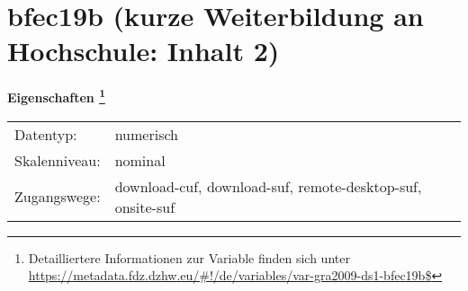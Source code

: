 
    \setcounter{footnote}{0}

    \vspace*{-1.8cm}
	\section{bfec19b (kurze Weiterbildung an Hochschule: Inhalt 2)}
	\label{section:bfec19b}



    \vspace*{0.5cm}
    \noindent\textbf{Eigenschaften
	\footnote{Detailliertere Informationen zur Variable finden sich unter
		\url{https://metadata.fdz.dzhw.eu/\#!/de/variables/var-gra2009-ds1-bfec19b$}}}\\
	\begin{tabularx}{\hsize}{@{}lX}
	Datentyp: & numerisch \\
	Skalenniveau: & nominal \\
	Zugangswege: &
	  download-cuf, 
	  download-suf, 
	  remote-desktop-suf, 
	  onsite-suf
 \\
    \end{tabularx}



